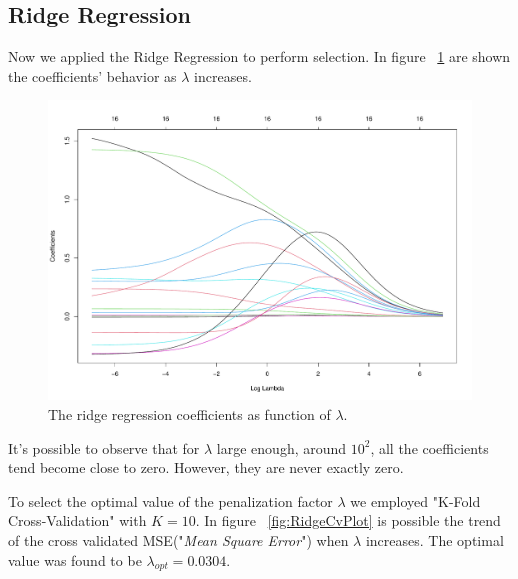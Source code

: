 \subsection{Ridge Regression}

Now we applied the Ridge Regression to perform selection. In figure \Fig~\ref{fig:RidgeCoefVsLambda} are shown the coefficients' behavior as $\lambda$ increases. 

\begin{figure}[h]
	\centering
	\includegraphics[width=0.4\linewidth]{ImageFiles/Regression/Ridge/RidgeCoefVsLambda}
	\caption{The ridge regression coefficients as function of $\lambda$.}
	\label{fig:RidgeCoefVsLambda}
\end{figure}

It's possible to observe that for $\lambda$ large enough, around $10^2$, all the coefficients tend become close to zero. However, they are never exactly zero.

To select the optimal value of the penalization factor $\lambda$ we employed "K-Fold Cross-Validation" with $K=10$. In figure \Fig~\ref{fig:RidgeCvPlot} is possible the trend of the cross validated MSE("\textit{Mean Square Error}") when $\lambda$ increases. The optimal value was found to be $\lambda_{opt} = 0.0304$.

